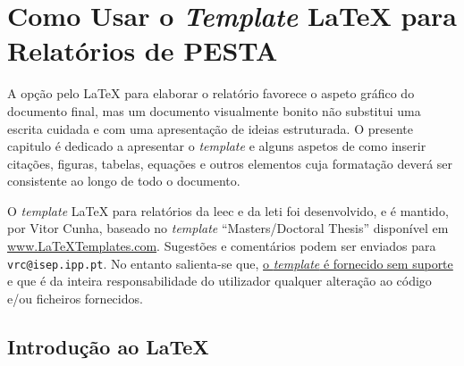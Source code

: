 
\chapter{Como Usar o \textit{Template} \LaTeX{} para Relatórios de PESTA}	%
\label{Chapter2}	%


A opção pelo \LaTeX{} para elaborar o relatório favorece o aspeto gráfico do documento final, mas um documento visualmente bonito não substitui uma escrita cuidada e com uma apresentação de ideias estruturada. O presente capitulo é dedicado a apresentar o \textit{template} e alguns aspetos de como inserir citações, figuras, tabelas, equações e outros elementos cuja formatação deverá ser consistente ao longo de todo o documento.

O \textit{template} \LaTeX{} para relatórios da \ac{leec} e da \ac{leti} foi desenvolvido, e é mantido, por Vitor Cunha, baseado no \textit{template} ``Masters/Doctoral Thesis'' disponível em \url{www.LaTeXTemplates.com}. Sugestões e comentários podem ser enviados para \verb|vrc@isep.ipp.pt|. No entanto salienta-se que, \underline{o \textit{template} é fornecido sem suporte} e que é da inteira responsabilidade do utilizador qualquer alteração ao código e/ou ficheiros fornecidos.

\section{Introdução ao \LaTeX{}}
\label{sec:Ch2.1}

